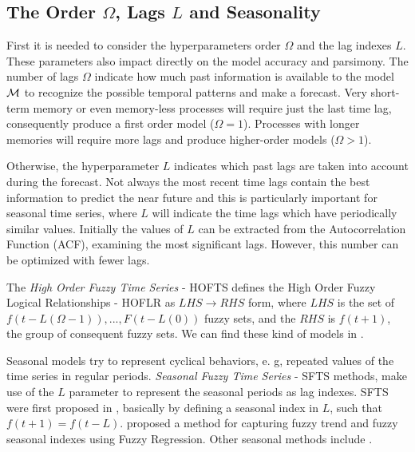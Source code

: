 %
\subsection{The Order $\Omega$, Lags $L$ and Seasonality}
\label{sec:fts_order}

First it is needed to consider the hyperparameters order $\Omega$ and the lag indexes $L$. These parameters also impact directly on the model accuracy and parsimony. The number of lags $\Omega$ indicate how much past information is available to the model $\mathcal{M}$ to recognize the possible temporal patterns and make a forecast. Very short-term memory or even memory-less processes will require just the last time lag, consequently produce a first order model ($\Omega = 1$). Processes with longer memories will require more lags and produce higher-order models ($\Omega>1$). 

Otherwise, the hyperparameter $L$ indicates which past lags are taken into account during the forecast. Not always the most recent time lags contain the best information to predict the near future and this is particularly important for seasonal time series, where $L$ will indicate the time lags which have periodically similar values. Initially the values of $L$ can be extracted from the Autocorrelation Function (ACF), examining the most significant lags. However, this number can be optimized with fewer lags.


The \textit{High Order Fuzzy Time Series} - HOFTS  defines the High Order Fuzzy Logical Relationships - HOFLR as $LHS \rightarrow RHS$ form, where $LHS$ is the set of $f(t-L(\Omega-1)), ..., F(t - L(0))$ fuzzy sets, and the $RHS$ is $f(t+1)$, the group of consequent fuzzy sets. We can find these kind of models in \cite{Chen2002, Chen2006a, Jilani2008a, Li2008b, Egrioglu2010, Bahrepour2011, Enayatifar2013, Chen2014, Chen2015a, Ye2016, Lee2017, Bose2017, Sadaei2017, Guney2018, Cheng2018, Yang2018, Zhang2018a}.


Seasonal models try to represent cyclical behaviors, e. g, repeated values of the time series in regular periods. \textit{Seasonal Fuzzy Time Series} - SFTS methods, make use of the $L$ parameter to represent the seasonal periods as lag indexes. SFTS were first proposed  in \cite{Song1997}, basically by defining a seasonal index in $L$, such that $f(t+1) = f(t-L)$. \cite{Chang1997} proposed a method for capturing fuzzy trend and fuzzy seasonal indexes using Fuzzy Regression. Other seasonal methods include \cite{Tseng1999, Song1999, Lee2011}. 

